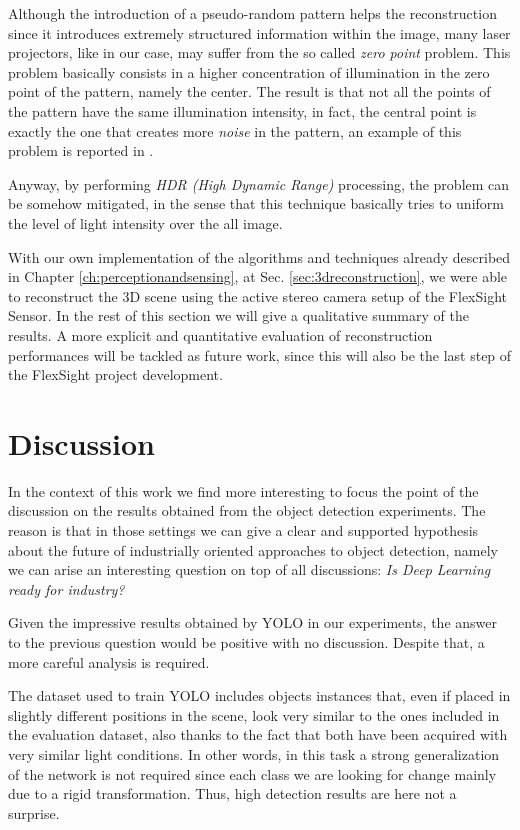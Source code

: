 Although the introduction of a pseudo-random pattern helps the reconstruction since it introduces extremely structured information within the image, many laser projectors, like in our case, may suffer from the so called \emph{zero point} problem. This problem basically consists in a higher concentration of illumination in the zero point of the pattern, namely the center. The result is that not all the points of the pattern have the same illumination intensity, in fact, the central point is exactly the one that creates more \emph{noise} in the pattern, an example of this problem is reported in .

Anyway, by performing \emph{HDR (High Dynamic Range)} processing, the problem can be somehow mitigated, in the sense that this technique basically tries to uniform the level of light intensity over the all image.

With our own implementation of the algorithms and techniques already described in Chapter \ref{ch:perceptionandsensing}, at Sec. \ref{sec:3dreconstruction}, we were able to reconstruct the 3D scene using the active stereo camera setup of the FlexSight Sensor. In the rest of this section we will give a qualitative summary of the results. A more explicit and quantitative evaluation of reconstruction performances will be tackled as future work, since this will also be the last step of the FlexSight project development.

\section{Discussion}\label{sec:exp_discussion}
In the context of this work we find more interesting to focus the point of the discussion on the results obtained from the object detection experiments. The reason is that in those settings we can give a clear and supported hypothesis about the future of industrially oriented approaches to object detection, namely we can arise an interesting question on top of all discussions: \emph{Is Deep Learning ready for industry?}

Given the impressive results obtained by YOLO in our experiments, the answer to the previous question would be positive with no discussion. Despite that, a more careful analysis is required.

The dataset used to train YOLO includes objects instances that, even if placed in slightly different positions in the scene, look very similar to the ones included in the evaluation dataset, also thanks to the fact that both have been acquired with very similar light conditions. In other words, in this task a strong generalization of the network is not required since each class we are looking for change mainly due to a rigid transformation. Thus, high detection results are here not a surprise. 

